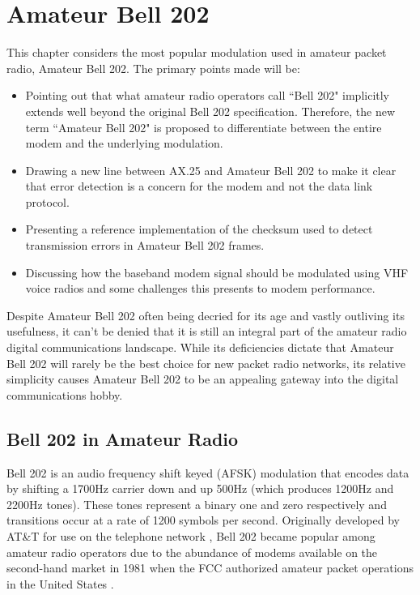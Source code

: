 \chapter{Amateur Bell 202}
\label{chap:bell202}

This chapter considers the most popular modulation used in amateur
packet radio, Amateur Bell 202. 
The primary points made will be:
\begin{itemize}
	\item Pointing out that what amateur radio operators call ``Bell 202"
		implicitly extends well beyond the original Bell 202 specification.
		Therefore, the new term ``Amateur Bell 202"
		is proposed to differentiate between the entire modem and the 
		underlying modulation.
	\item Drawing a new line between AX.25 and Amateur Bell 202 to make it clear
		that error detection is a concern for the modem and not the 
		data link protocol.
	\item Presenting a reference implementation of the checksum used
		to detect transmission errors in Amateur Bell 202 frames.
	\item Discussing how the baseband modem signal should be modulated using
		VHF voice radios and some challenges this presents
		to modem performance.
\end{itemize}

Despite Amateur Bell 202 often being decried for its age and 
vastly outliving its usefulness,
it can't be denied that it is still an integral part of the amateur radio
digital communications landscape.
While its deficiencies dictate that Amateur Bell 202 will rarely be the best
choice for new packet radio networks, 
its relative simplicity causes
Amateur Bell 202 to be an appealing gateway into the digital communications hobby.

\section{Bell 202 in Amateur Radio}
\label{sec:bell202history}

Bell 202 is an audio frequency shift keyed (AFSK) modulation that
encodes data by shifting a 1700Hz carrier down and up 500Hz (which
produces 1200Hz and 2200Hz tones).
These tones represent a binary one and zero respectively and transitions occur
at a rate of 1200 symbols per second.
Originally developed by AT\&T for use on the telephone network \cite{202tspec},
Bell 202 became popular among amateur radio operators due to the abundance
of modems available on the second-hand market in 1981 when the FCC authorized
amateur packet operations in the United States \cite{gatewaypacket}.

